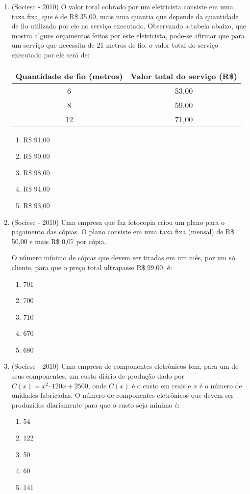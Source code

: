 \begin{enumerate}
 \item (Sociesc - 2010) O valor total cobrado por um eletricista consiste em uma taxa fixa, que é de R\$ 35,00, mais uma quantia que depende da quantidade de fio utilizada por ele no serviço executado. Observando a tabela abaixo, que mostra alguns orçamentos feitos por este eletricista, pode-se afirmar que para um serviço que necessita de 21 metros de fio, o valor total do serviço executado por ele será de:

  \begin{table}[H]
  \centering
 \begin{tabular}{|c|c|} \hline
  \multicolumn{1}{|c|}{\textbf{Quantidade de fio
(metros)}} & \multicolumn{1}{|c|}{\textbf{Valor total do serviço
(R\$)}} \\ \hline
 6 & 53,00 \\ \hline
 8 & 59,00 \\ \hline
 12 & 71,00 \\ \hline
 \end{tabular}
\end{table}

  \begin{enumerate}
  \item R\$ 91,00
  \item R\$ 90,00
  \item R\$ 98,00
  \item R\$ 94,00
  \item R\$ 93,00
 \end{enumerate}

 \item (Sociesc - 2010) Uma empresa que faz fotocopia criou um plano para o pagamento das cópias. O plano consiste em uma taxa fixa (mensal) de R\$ 50,00 e mais R\$ 0,07 por cópia.

  O número mínimo de cópias que devem ser tiradas em um mês, por um só cliente, para que o preço total ultrapasse R\$ 99,00, é:
  \begin{enumerate}
  \item 701
  \item 700
  \item 710
  \item 670
  \item 680
 \end{enumerate}

 \item (Sociesc - 2010) Uma empresa de componentes eletrônicos tem, para um de seus componentes, um custo diário de produção dado por $C(x) = x^2 – 120x + 2500$, onde $C(x)$ é o custo em reais e $x$ é o número de unidades fabricadas. O número de componentes eletrônicos que devem ser produzidos diariamente para que o custo seja mínimo é:
 \begin{enumerate}
  \item 54
  \item 122
  \item 50
  \item 60
  \item 141
 \end{enumerate}


\end{enumerate}
